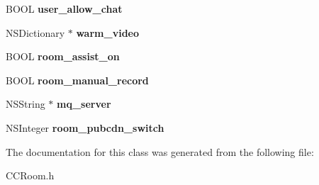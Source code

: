 \begin{DoxyCompactItemize}
\mbox{\label{interface_c_c_room_ae4ef5845430fa40fbc04799c0c001d51}} 
B\+O\+OL {\bfseries user\+\_\+allow\+\_\+chat}
\item 
\mbox{\label{interface_c_c_room_ae7aa6e0fa36ddc8d3006cef07ac8e7c6}} 
N\+S\+Dictionary $\ast$ {\bfseries warm\+\_\+video}
\item 
\mbox{\label{interface_c_c_room_ad2b750587497d0a7c788ae705bd8fc72}} 
B\+O\+OL {\bfseries room\+\_\+assist\+\_\+on}
\item 
\mbox{\label{interface_c_c_room_a2b608c34be153db662575c4f157cf092}} 
B\+O\+OL {\bfseries room\+\_\+manual\+\_\+record}
\item 
\mbox{\label{interface_c_c_room_ae6ddfc2201b89303ea888342147ae1d4}} 
N\+S\+String $\ast$ {\bfseries mq\+\_\+server}
\item 
\mbox{\label{interface_c_c_room_ac55f053f66f8f3e3a901cee4bfadbd5c}} 
N\+S\+Integer {\bfseries room\+\_\+pubcdn\+\_\+switch}
\end{DoxyCompactItemize}


The documentation for this class was generated from the following file\+:\begin{DoxyCompactItemize}
\item 
C\+C\+Room.\+h\end{DoxyCompactItemize}
